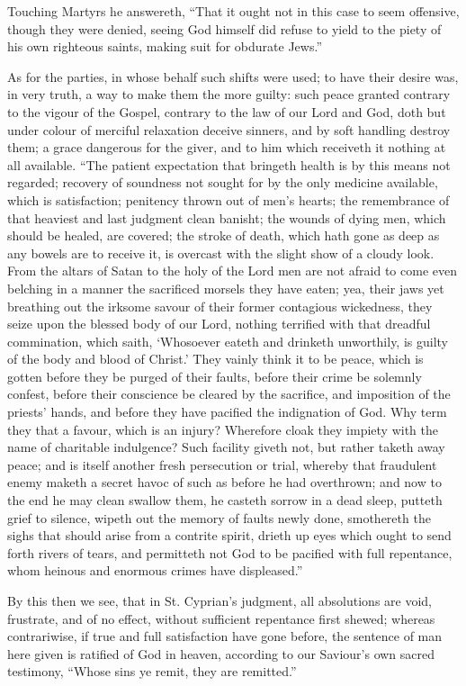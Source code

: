 Touching Martyrs he answereth, “That it ought not in this case to seem offensive, though they were denied, seeing God himself did refuse to yield to the piety of his own righteous saints, making suit for obdurate Jews.”

As for the parties, in whose behalf such shifts were used; to have their desire was, in very truth, a way to make them the more guilty: such peace granted contrary to the vigour of the Gospel, contrary to the law of our Lord and God, doth but under colour of merciful relaxation deceive sinners, and by soft handling destroy them; a grace dangerous for the giver, and to him which receiveth it nothing at all available. “The patient expectation that bringeth health is by this means not regarded; recovery of soundness not sought for  by the only medicine available, which is satisfaction; penitency thrown out of men’s hearts; the remembrance of that heaviest and last judgment clean banisht; the wounds of dying men, which should be healed, are covered; the stroke of death, which hath gone as deep as any bowels are to receive it, is overcast with the slight show of a cloudy look. From the altars of Satan to the holy of the Lord men are not afraid to come even belching in a manner the sacrificed morsels they have eaten; yea, their jaws yet breathing out the irksome savour of their former contagious wickedness, they seize upon the blessed body of our Lord, nothing terrified with that dreadful commination, which saith, ‘Whosoever eateth and drinketh unworthily, is guilty of the body and blood of Christ.’ They vainly think it to be peace, which is gotten before they be purged of their faults, before their crime be solemnly confest, before their conscience be cleared by the sacrifice, and imposition of the priests’ hands, and before they have pacified the indignation of God. Why term they that a favour, which is an injury? Wherefore cloak they impiety with the name of charitable indulgence? Such facility giveth not, but rather taketh away peace; and is itself another fresh persecution or trial, whereby that fraudulent enemy maketh a secret havoc of such as before he had overthrown; and now to the end he may clean swallow them, he casteth sorrow in a dead sleep, putteth grief to silence, wipeth out the memory of faults newly done, smothereth the sighs that should arise from a contrite spirit, drieth up eyes which ought to send forth rivers of tears, and permitteth not God to be pacified with full repentance, whom heinous and enormous crimes have displeased.”

By this then we see, that in St. Cyprian’s judgment, all absolutions are void, frustrate, and of no effect, without sufficient repentance first shewed; whereas contrariwise, if true and full satisfaction have gone before, the sentence of man here given is ratified of God in heaven, according to our Saviour’s own sacred testimony, “Whose sins ye remit, they are remitted.”


